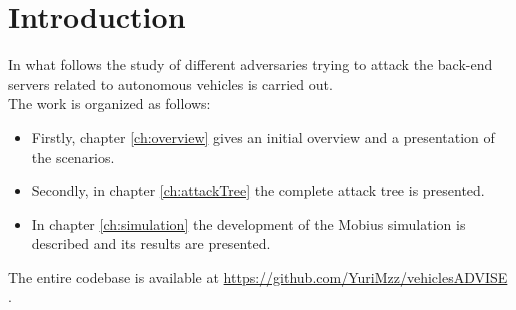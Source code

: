 %
\chapter{Introduction}\label{ch:introduction}
In what follows the study of different adversaries trying to attack the back-end servers related to autonomous vehicles is carried out.\\

The work is organized as follows:
\begin{itemize}
    \item Firstly, chapter \ref{ch:overview} gives an initial overview and a presentation of the scenarios.
    \item Secondly, in chapter \ref{ch:attackTree} the complete attack tree is presented.
    \item In chapter \ref{ch:simulation} the development of the Mobius simulation is described and its results are presented.
\end{itemize}
    
\noindent
The entire codebase is available at \url{https://github.com/YuriMzz/vehiclesADVISE} .